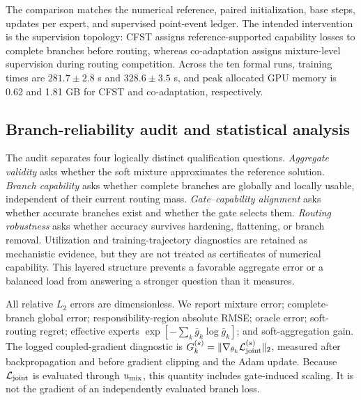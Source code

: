 \documentclass[preprint,12pt]{elsarticle}
\theoremstyle{remark}
\begin{document}
The comparison matches the numerical reference, paired initialization, base steps, updates per expert, and supervised point-event ledger. The intended intervention is the supervision topology: CFST assigns reference-supported capability losses to complete branches before routing, whereas co-adaptation assigns mixture-level supervision during routing competition. Across the ten formal runs, training times are $281.7\pm2.8$ s and $328.6\pm3.5$ s, and peak allocated GPU memory is 0.62 and 1.81 GB for CFST and co-adaptation, respectively.

\subsection{Branch-reliability audit and statistical analysis}
The audit separates four logically distinct qualification questions. \emph{Aggregate validity} asks whether the soft mixture approximates the reference solution. \emph{Branch capability} asks whether complete branches are globally and locally usable, independent of their current routing mass. \emph{Gate--capability alignment} asks whether accurate branches exist and whether the gate selects them. \emph{Routing robustness} asks whether accuracy survives hardening, flattening, or branch removal. Utilization and training-trajectory diagnostics are retained as mechanistic evidence, but they are not treated as certificates of numerical capability. This layered structure prevents a favorable aggregate error or a balanced load from answering a stronger question than it measures.

All relative $L_2$ errors are dimensionless. We report mixture error; complete-branch global error; responsibility-region absolute RMSE; oracle error; soft-routing regret; effective experts $\exp[-\sum_k\bar g_k\log\bar g_k]$; and soft-aggregation gain. The logged coupled-gradient diagnostic is
$G_k^{(s)}=\|\nabla_{\theta_k}\mathcal L_{\rm joint}^{(s)}\|_2$, measured after backpropagation and before gradient clipping and the Adam update. Because $\mathcal L_{\rm joint}$ is evaluated through $u_{\rm mix}$, this quantity includes gate-induced scaling. It is not the gradient of an independently evaluated branch loss.
\end{document}
